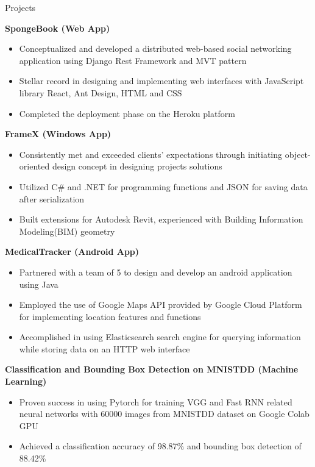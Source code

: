 \documentclass{resume} %
\begin{document}
\begin{rSection}{Projects}

{\bf SpongeBook (Web App)}
\begin{itemize}
\item Conceptualized and developed a distributed web-based social networking application using Django Rest Framework and MVT pattern
\item Stellar record in designing and implementing web interfaces with JavaScript library React, Ant Design, HTML and CSS
\item Completed the deployment phase on the Heroku platform
\end{itemize}

{\bf FrameX  (Windows App)}
\begin{itemize}
\item Consistently met and exceeded clients’ expectations through initiating object-oriented design concept in designing projects solutions 
\item Utilized C\# and .NET for programming functions and JSON for saving data after serialization
\item Built extensions for Autodesk Revit, experienced with Building Information Modeling(BIM) geometry
\end{itemize}

{\bf MedicalTracker (Android  App)}
\begin{itemize}
\item Partnered with a team of 5 to design and develop an android application using Java
\item Employed the use of Google Maps API provided by Google Cloud Platform for implementing location features and functions
\item Accomplished in using Elasticsearch search engine for querying information while storing data on an HTTP web interface
\end{itemize}

{\bf Classification and Bounding Box Detection on MNISTDD (Machine Learning)}
\begin{itemize}
\item Proven success in using Pytorch for training VGG and Fast RNN related neural networks with 60000 images from MNISTDD dataset on Google Colab GPU
\item Achieved a classification accuracy of 98.87\% and bounding box detection of 88.42\%
\end{itemize}


\end{rSection}
\end{document}
